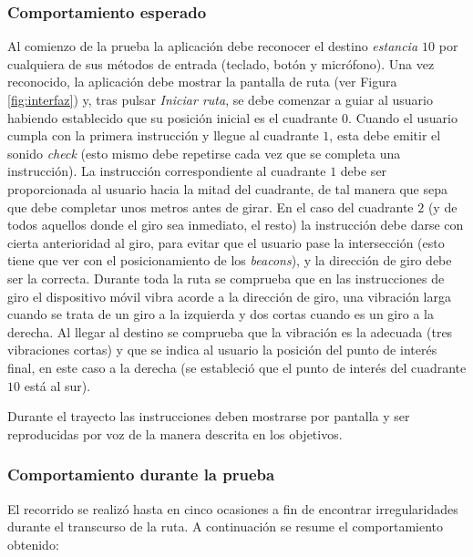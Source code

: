 \subsubsection*{Comportamiento esperado}

Al comienzo de la prueba la aplicación debe reconocer el destino \textit{estancia $10$} por cualquiera de sus métodos de entrada (teclado, botón y micrófono). Una vez reconocido, la aplicación debe mostrar la pantalla de ruta (ver Figura \ref{fig:interfaz}) y, tras pulsar \textit{Iniciar ruta}, se debe comenzar a guiar al usuario habiendo establecido que su posición inicial es el cuadrante $0$. Cuando el usuario cumpla con la primera instrucción y llegue al cuadrante $1$, esta debe emitir el sonido \textit{check} (esto mismo debe repetirse cada vez que se completa una instrucción). La instrucción correspondiente al cuadrante $1$ debe ser proporcionada al usuario hacia la mitad del cuadrante, de tal manera que sepa que debe completar unos metros antes de girar. En el caso del cuadrante $2$ (y de todos aquellos donde el giro sea inmediato, el resto) la instrucción debe darse con cierta anterioridad al giro, para evitar que el usuario pase la intersección (esto tiene que ver con el posicionamiento de los \textit{beacons}), y la dirección de giro debe ser la correcta. Durante toda la ruta se comprueba que en las instrucciones de giro el dispositivo móvil vibra acorde a la dirección de giro, una vibración larga cuando se trata de un giro a la izquierda y dos cortas cuando es un giro a la derecha. Al llegar al destino se comprueba que la vibración es la adecuada (tres vibraciones cortas) y que se indica al usuario la posición del punto de interés final, en este caso a la derecha (se estableció que el punto de interés del cuadrante $10$ está al sur).

Durante el trayecto las instrucciones deben mostrarse por pantalla y ser reproducidas por voz de la manera descrita en los objetivos.

\subsubsection*{Comportamiento durante la prueba}
 
El recorrido se realizó hasta en cinco ocasiones a fin de encontrar irregularidades durante el transcurso de la ruta. A continuación se resume el comportamiento obtenido:

